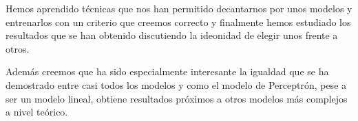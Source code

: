 \documentclass[11pt]{article}
\begin{document}
Hemos aprendido técnicas que nos han permitido decantarnos por unos modelos y
entrenarlos con un criterio que creemos correcto y finalmente hemos estudiado
los resultados que se han obtenido discutiendo la ideonidad de elegir unos
frente a otros. 

Además creemos que ha sido especialmente interesante la igualdad que se ha
demostrado entre casi todos los modelos y como el modelo de Perceptrón,
pese a ser un modelo lineal, obtiene resultados próximos a otros modelos más
complejos a nivel teórico.




%


\end{document}
